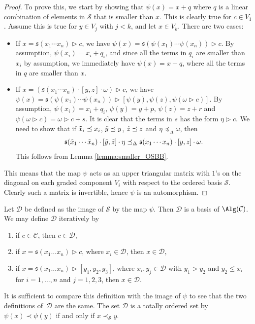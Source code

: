 \documentclass[pdftex]{sigma}
\numberwithin{equation}{section}
\begin{document}
\begin{proof}
 To prove this, we start by showing that $\psi(x) = x + q$ where $q$ is a linear combination of elements in $\mathcal{S}$ that is smaller than $x$. This is clearly true for $c \in V_1$. Assume this is true for $y \in V_j$ with $j<k$, and let $x \in V_k$. There are two cases:
 \begin{itemize}\itemsep=0pt
 \item If $x = \mathfrak{s}(x_1 \cdots x_n) \rhd c$, we have $\psi(x) = \mathfrak{s}(\psi(x_1) \cdots \psi(x_n)) \rhd c$. By assumption, $\psi(x_i) = x_i +q_i$, and since all the terms in $q_i$ are smaller than $x_i$ by assumption, we immediately have $\psi(x) = x + q$, where all the terms in $q$ are smaller than $x$.
 \item If $x = (\mathfrak{s}(x_1 \cdots x_n) \cdot [y, z] \cdot \omega) \rhd c$, we have $\psi(x) = \mathfrak{s}(\psi(x_1) \cdots \psi(x_n)) \rhd [\psi(y), \psi(z), \psi(\omega \rhd c)]$. By assumption, $\psi(x_i) = x_i + q_i$, $\psi(y) = y + p$, $\psi(z) = z + r$ and $\psi(\omega \rhd c) = \omega \rhd c + s$. It is clear that the terms in $s$ has the form $\eta \rhd c$. We need to show that if $\Tilde{x}_i\preceq x_i$, $\Tilde{y} \preceq y$, $\Tilde{z} \preceq z$ and $\eta \preceq_{\Delta} \omega$, then
 \[
 \mathfrak{s}(\Tilde{x}_1 \cdots \Tilde{x}_n) \cdot [\Tilde{y}, \Tilde{z}] \cdot \eta \preceq_{\Delta} \mathfrak{s}(x_1 \cdots x_n) \cdot [y, z] \cdot \omega.
 \]
 This follows from Lemma \ref{lemma:smaller_OSBB}.
 \end{itemize}
 This means that the map $\psi$ acts as an upper triangular matrix with $1$'s on the diagonal on each graded component $V_i$ with respect to the ordered basis $\mathcal{S}$. Clearly such a matrix is invertible, hence $\psi$ is an automorphism.
\end{proof}

Let $\mathcal{D}$ be defined as the image of $\mathcal{S}$ by the map $\psi$. Then $\mathcal{D}$ is a basis of $\Alg(\mathcal{C})$. We may define $\mathcal{D}$ iteratively by
\begin{enumerate}\itemsep=0pt
 \item[(i)] if $c \in \mathcal{C}$, then $c \in \mathcal{D}$,
 \item[(ii)] if $x = \mathfrak{s}(x_1 \dots x_n) \rhd c$, where $x_i \in \mathcal{D}$, then $x \in \mathcal{D}$,
 \item[(iii)] if $x = \mathfrak{s}(x_1 \dots x_n) \rhd [y_1, y_2, y_3]$, where $x_i, y_j \in \mathcal{D}$ with $y_1 > y_2$ and $y_2 \leq x_i$ for $i=1, \dots , n$ and $j=1,2,3$, then $x \in \mathcal{D}$.
\end{enumerate}
It is sufficient to compare this definition with the image of $\psi$ to see that the two definitions of~$\mathcal{D}$ are the same. The set $\mathcal{D}$ is a totally ordered set by $\psi(x) \prec \psi(y)$ if and only if $x \prec_{\mathcal{S}} y$.
\end{document}
